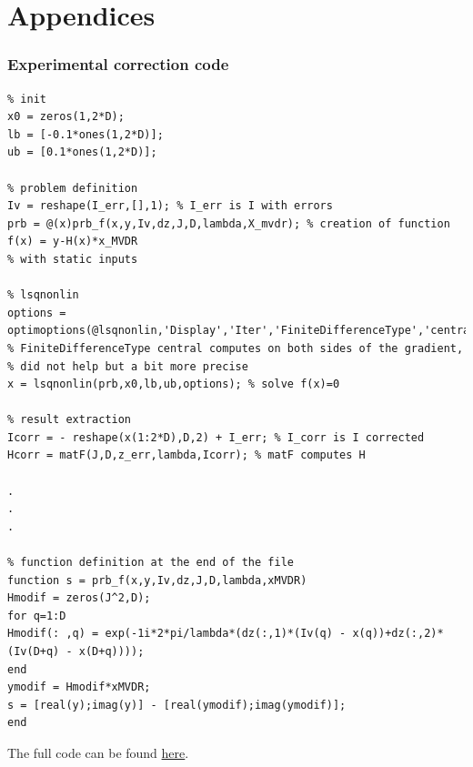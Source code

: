 \documentclass[titlepage,11pt]{article}
\begin{document}
	\newpage
	\part{Appendices}
	\section{Experimental correction code}
	
\begin{verbatim}
% init
x0 = zeros(1,2*D);
lb = [-0.1*ones(1,2*D)];
ub = [0.1*ones(1,2*D)];

% problem definition
Iv = reshape(I_err,[],1); % I_err is I with errors
prb = @(x)prb_f(x,y,Iv,dz,J,D,lambda,X_mvdr); % creation of function f(x) = y-H(x)*x_MVDR 
% with static inputs

% lsqnonlin
options = optimoptions(@lsqnonlin,'Display','Iter','FiniteDifferenceType','central'); 
% FiniteDifferenceType central computes on both sides of the gradient,
% did not help but a bit more precise
x = lsqnonlin(prb,x0,lb,ub,options); % solve f(x)=0

% result extraction
Icorr = - reshape(x(1:2*D),D,2) + I_err; % I_corr is I corrected
Hcorr = matF(J,D,z_err,lambda,Icorr); % matF computes H 

.
.
.

% function definition at the end of the file
function s = prb_f(x,y,Iv,dz,J,D,lambda,xMVDR)
Hmodif = zeros(J^2,D);
for q=1:D
Hmodif(: ,q) = exp(-1i*2*pi/lambda*(dz(:,1)*(Iv(q) - x(q))+dz(:,2)*(Iv(D+q) - x(D+q))));
end 
ymodif = Hmodif*xMVDR;
s = [real(y);imag(y)] - [real(ymodif);imag(ymodif)];
end

\end{verbatim}

	The full code can be found \href{https://github.com/RUValaS/RDR}{here}.
	
	\newpage
	\printbibliography
\end{document}
